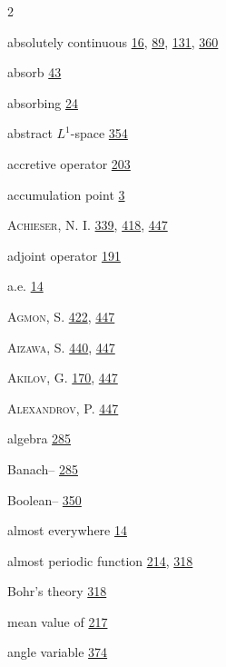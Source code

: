 \label{chap:Index}
\setlength{\columnsep}{8mm}\setlength{\multicolsep}{0pt}
\begin{multicols}{2}\raggedcolumns\footnotesize\raggedright\setlength{\parindent}{0pt}\setlength{\parskip}{0pt}
\noindent absolutely continuous \hyperlink{page.16}{16}, \hyperlink{page.89}{89}, \hyperlink{page.131}{131}, \hyperlink{page.360}{360}\par
\noindent absorb \hyperlink{page.43}{43}\par
\noindent absorbing \hyperlink{page.24}{24}\par
\noindent abstract $L^{1}$-space \hyperlink{page.354}{354}\par
\noindent accretive operator \hyperlink{page.203}{203}\par
\noindent accumulation point \hyperlink{page.3}{3}\par
\noindent \textsc{Achieser}, N. I. \hyperlink{page.339}{339}, \hyperlink{page.418}{418}, \hyperlink{page.447}{447}\par
\noindent adjoint operator \hyperlink{page.191}{191}\par
\noindent a.e. \hyperlink{page.14}{14}\par
\noindent \textsc{Agmon}, S. \hyperlink{page.422}{422}, \hyperlink{page.447}{447}\par
\noindent \textsc{Aizawa}, S. \hyperlink{page.440}{440}, \hyperlink{page.447}{447}\par
\noindent \textsc{Akilov}, G. \hyperlink{page.170}{170}, \hyperlink{page.447}{447}\par
\noindent \textsc{Alexandrov}, P. \hyperlink{page.447}{447}\par
\noindent algebra \hyperlink{page.285}{285}\par
\hspace*{1.1em}Banach-- \hyperlink{page.285}{285}\par
\hspace*{1.1em}Boolean-- \hyperlink{page.350}{350}\par
\noindent almost everywhere \hyperlink{page.14}{14}\par
\noindent almost periodic function \hyperlink{page.214}{214}, \hyperlink{page.318}{318}\par
\hspace*{1.1em}Bohr's theory \hyperlink{page.318}{318}\par
\hspace*{1.1em}mean value of \hyperlink{page.217}{217}\par
\noindent angle variable \hyperlink{page.374}{374}\par

\end{multicols}
